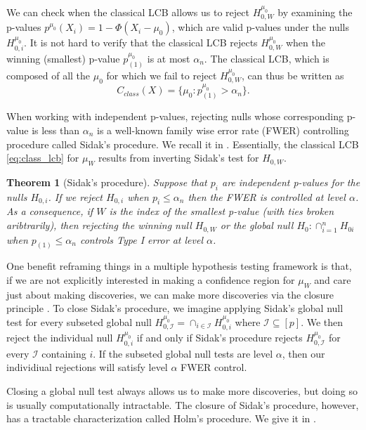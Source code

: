 \documentclass{article}
\newtheorem{theorem}{Theorem}
\begin{document}
We can check when the classical LCB allows us to reject $H^{\mu_0}_{0, W}$ by examining the p-values $p^{\mu_0}(X_i) = 1- \Phi(X_i - \mu_0)$, which are valid p-values under the nulls $H^{\mu_0}_{0, i}$. It is not hard to verify that the classical LCB rejects $H^{\mu_0}_{0, W}$ when the winning (smallest) p-value $p^{\mu_0}_{(1)}$ is at most $\alpha_n$. The classical LCB, which is composed of all the $\mu_0$ for which we fail to reject $H^{\mu_0}_{0, W}$, can thus be written as 
\begin{equation}
    \label{eq:class_lcb}
    C_{class}(X) = \{\mu_0 : p^{\mu_0}_{(1)} > \alpha_n \}. 
\end{equation}

When working with independent p-values, rejecting nulls whose corresponding p-value is less than $\alpha_n$ is a well-known family wise error rate (FWER) controlling procedure called Sidak's procedure. We recall it in  \citep{Sidak}. Essentially, the classical LCB \eqref{eq:class_lcb} for $\mu_W$ results from inverting Sidak's test for $H_{0, W}$. 

\begin{theorem}[Sidak's procedure]
     \label{thm:sidak_testing}
     Suppose that $p_{i}$ are independent p-values for the nulls $H_{0, i}$. If we reject $H_{0, i}$ when $p_{i} \leq \alpha_n$ then the FWER is controlled at level $\alpha$. As a consequence, if $W$ is the index of the smallest p-value (with ties broken aribtrarily), then rejecting the winning null $H_{0, W}$ or the global null $H_0 : \cap_{i=1}^n H_{0i}$ when $p_{(1)} \leq \alpha_n$ controls Type I error at level $\alpha$. 
\end{theorem}

One benefit reframing things in a multiple hypothesis testing framework is that, if we are not explicitly interested in making a confidence region for $\mu_{W}$ and care just about making discoveries, we can make more discoveries via the closure principle \citep{Marcus}. To close Sidak's procedure, we imagine applying Sidak's global null test for every subseted global null $H^{\mu_0}_{0, \mathcal{I}} = \cap_{i \in \mathcal{I}} H^{\mu_0}_{0, i}$ where $\mathcal{I} \subseteq [p]$. We then reject the individual null $H^{\mu_0}_{0, i}$ if and only if Sidak's procedure rejects $H^{\mu_0}_{0, \mathcal{I}}$ for every $\mathcal{I}$ containing $i$. If the subseted global null tests are level $\alpha$, then our individiual rejections will satisfy level $\alpha$ FWER control. 

Closing a global null test always allows us to make more discoveries, but doing so is usually computationally intractable. The closure of Sidak's procedure, however, has a tractable characterization called Holm's procedure. We give it in . 
\end{document}
